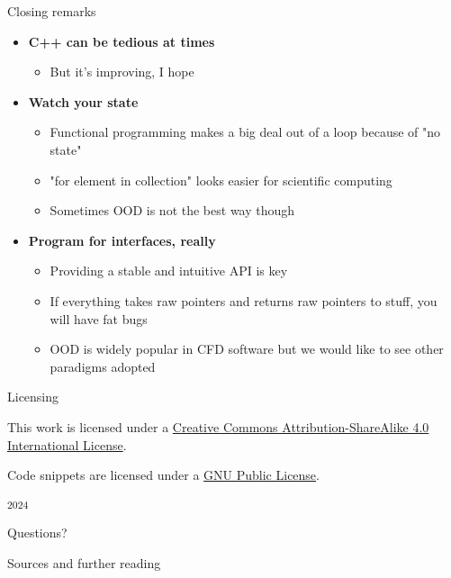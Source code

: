 \begin{frame}[fragile]{Closing remarks}

    \begin{itemize}
        \item \textbf{C++ can be tedious at times}
        \begin{itemize}
            \item But it's improving, I hope
        \end{itemize}
        \item \textbf{Watch your state}
        \begin{itemize}
            \item Functional programming makes a big deal out of a loop because of "no state"
            \item "for element in collection" looks easier for scientific computing
            \item Sometimes OOD is not the best way though
        \end{itemize}
        \item \textbf{Program for interfaces, really}
        \begin{itemize}
            \item Providing a stable and intuitive API is key
            \item If everything takes raw pointers and returns raw pointers to stuff, you will have fat bugs
            \item OOD is widely popular in CFD software but we would like to see other paradigms adopted
        \end{itemize}
    \end{itemize}

\end{frame}

\begin{frame}{Licensing}

    This work is licensed under a
    \href{http://creativecommons.org/licenses/by-sa/4.0/}{Creative Commons
    Attribution-ShareAlike 4.0 International License}.

    Code snippets are licensed under a \href{http://www.gnu.org/licenses/gpl.txt}{GNU Public License}.

    \begin{center}\ccbysa \hspace{2mm} \textsuperscript{2024}\end{center}

\end{frame}

\begin{frame}[standout]
  Questions?
\end{frame}

\appendix

\begin{frame}[allowframebreaks]{Sources and further reading}
\printbibliography[heading=none]
\end{frame}
